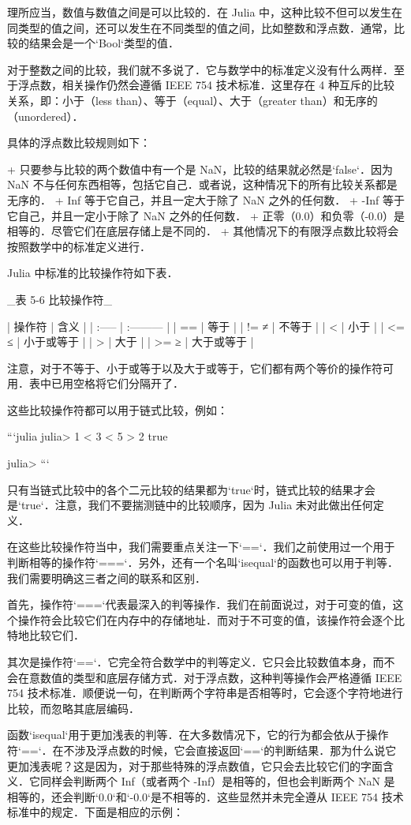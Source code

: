 理所应当，数值与数值之间是可以比较的．在 Julia 中，这种比较不但可以发生在同类型的值之间，还可以发生在不同类型的值之间，比如整数和浮点数．通常，比较的结果会是一个`Bool`类型的值．

对于整数之间的比较，我们就不多说了．它与数学中的标准定义没有什么两样．至于浮点数，相关操作仍然会遵循 IEEE 754 技术标准．这里存在 4 种互斥的比较关系，即：小于（less than）、等于（equal）、大于（greater than）和无序的（unordered）．

具体的浮点数比较规则如下：

+ 只要参与比较的两个数值中有一个是 NaN，比较的结果就必然是`false`．因为 NaN 不与任何东西相等，包括它自己．或者说，这种情况下的所有比较关系都是无序的．
+ Inf 等于它自己，并且一定大于除了 NaN 之外的任何数．
+ -Inf 等于它自己，并且一定小于除了 NaN 之外的任何数．
+ 正零（0.0）和负零（-0.0）是相等的．尽管它们在底层存储上是不同的．
+ 其他情况下的有限浮点数比较将会按照数学中的标准定义进行．

Julia 中标准的比较操作符如下表．

_表 5-6 比较操作符_

| 操作符 | 含义       |
| :----- | :--------- |
| ==     | 等于       |
| != ≠   | 不等于     |
| <      | 小于       |
| <= ≤   | 小于或等于 |
| >      | 大于       |
| >= ≥   | 大于或等于 |

注意，对于不等于、小于或等于以及大于或等于，它们都有两个等价的操作符可用．表中已用空格将它们分隔开了．

这些比较操作符都可以用于链式比较，例如：

```julia
julia> 1 < 3 < 5 > 2
true

julia> 
```

只有当链式比较中的各个二元比较的结果都为`true`时，链式比较的结果才会是`true`．注意，我们不要揣测链中的比较顺序，因为 Julia 未对此做出任何定义．

在这些比较操作符当中，我们需要重点关注一下`==`．我们之前使用过一个用于判断相等的操作符`===`．另外，还有一个名叫`isequal`的函数也可以用于判等．我们需要明确这三者之间的联系和区别．

首先，操作符`===`代表最深入的判等操作．我们在前面说过，对于可变的值，这个操作符会比较它们在内存中的存储地址．而对于不可变的值，该操作符会逐个比特地比较它们．

其次是操作符`==`．它完全符合数学中的判等定义．它只会比较数值本身，而不会在意数值的类型和底层存储方式．对于浮点数，这种判等操作会严格遵循 IEEE 754 技术标准．顺便说一句，在判断两个字符串是否相等时，它会逐个字符地进行比较，而忽略其底层编码．

函数`isequal`用于更加浅表的判等．在大多数情况下，它的行为都会依从于操作符`==`．在不涉及浮点数的时候，它会直接返回`==`的判断结果．那为什么说它更加浅表呢？这是因为，对于那些特殊的浮点数值，它只会去比较它们的字面含义．它同样会判断两个 Inf（或者两个 -Inf）是相等的，但也会判断两个 NaN 是相等的，还会判断`0.0`和`-0.0`是不相等的．这些显然并未完全遵从 IEEE 754 技术标准中的规定．下面是相应的示例：

